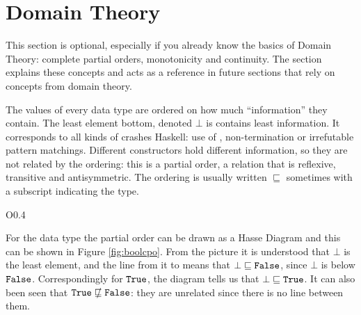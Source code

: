 \section{Domain Theory}

This section is optional, especially if you already know the basics of
Domain Theory: complete partial orders, monotonicity and
continuity.
The section explains these concepts and acts as a reference in future
sections that rely on concepts from domain theory.

The values of every data type are ordered on how much ``information''
they contain. The least element bottom, denoted $\bot$ is contains
least information. It corresponds to all kinds of crashes Haskell: use
of , non-termination or irrefutable pattern matchings.
Different constructors hold different information, so they are not
related by the ordering: this is a partial order, a relation that is
reflexive, transitive and antisymmetric. The ordering is usually
written $\sqsubseteq$ sometimes with a subscript indicating the type.

\begin{wrapfigure}{O}{0.4\textwidth} %
\vspace{-7pt}
\centering 
\vspace{-7pt}
\caption{
    The cpo of Bool values.
    \label{fig:boolcpo}
}
\end{wrapfigure}
For the  data type the partial order can be drawn as a Hasse
Diagram and this can be shown in Figure \ref{fig:boolcpo}.  From the
picture it is understood that $\bot$ is the least element, and the
line from it to  means that $\bot \sqsubseteq \hs{False}$,
since $\bot$ is below $\hs{False}$. Correspondingly for $\hs{True}$,
the diagram tells us that $\bot \sqsubseteq \hs{True}$. It can also
been seen that $\hs{True} \nsqsubseteq \hs{False}$: they are unrelated
since there is no line between them.

%


